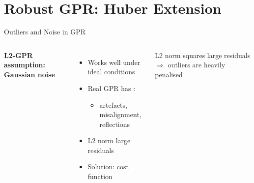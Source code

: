 %

\section{Robust GPR: Huber Extension}

\begin{frame}{Outliers and Noise in GPR}
  \begin{columns}[T]
      \vspace{0.3em}
      \centering

      \vspace{0.3em}
      \textbf{L2-GPR assumption: Gaussian noise}
      \begin{itemize}
        \item Works well under ideal conditions
        \pause
        \item Real GPR has :
          \begin{itemize}
            \item artefacts, misalignment, reflections
          \end{itemize}
        \pause
        \item L2 norm  large residuals
        \pause
        \item Solution:  cost function
      \end{itemize}

      \vspace{0.6em}
      \begin{shibuiwarning}[Warning]
        L2 norm squares large residuals
        $\Rightarrow$ outliers are heavily penalised
      \end{shibuiwarning}
  \end{columns}
\end{frame}

